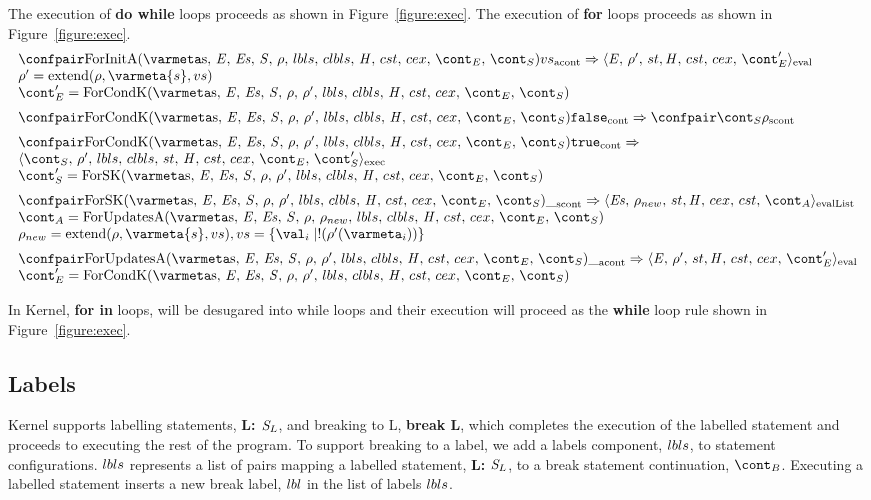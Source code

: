 \documentclass{article}
\DeclareMathOperator{\extend}{extend}
\begin{document}
The execution of \textbf{do while} loops proceeds as shown in Figure~\ref{figure:exec}.
The execution of \textbf{for} loops proceeds as shown in Figure~\ref{figure:exec}.
\[
 \begin{array}{l}
	\acontconf{\ForInitA}{\vals}
	\Rightarrow
	\evalconf{\expressionmeta}{\env'}{\strace}{\cstrace}{\cex}{\econt'} \\
	\env' = \extend(\env, \varmeta{s}, \vals) \\
	\econt' = \ForCondK
	\\[2mm]

	\contconf{\ForCondK}{\tt{false}}
	\Rightarrow
	\scontconf{\scont}{\env}
	\\[2mm]

	\contconf{\ForCondK}{\tt{true}}
	\Rightarrow \\
	\execconf{\scont}{\env'}{\lbls}{\clbls}{\handler}{\cstrace}{\cex}{\econt}{\scont'} \\
	\scont' = \ForSK
	\\[2mm]

	\scontconf{\ForSK}{\_}
	\Rightarrow
	\evallistconf{\exprs}{\env_{new}}{st}{cex}{cst}{\acont} \\
	\acont = \ForUpdatesA{\env_{new}} \\
	\env_{new} = \extend(\env, \varmeta{s}, \vals), \vals = \{\val_i \mid \deref(\env'(\varmeta_i))\}
	\\[2mm]

	\acontconf{\ForUpdatesA{\env'}}{\_}
	\Rightarrow
	\evalconf{\expressionmeta}{\env'}{\strace}{\cstrace}{\cex}{\econt'}\\
	\econt' = \ForCondK
 \end{array}
\]

In Kernel, \textbf{for in} loops, will be desugared into while loops and their execution will proceed as the \textbf{while} loop rule shown in Figure~\ref{figure:exec}.
\subsection{Labels}

Kernel supports labelling statements, \textbf{L: $\mathit{S}_{L}$}, and breaking to L, \textbf{break L}, which completes the execution of the labelled statement and proceeds to executing the rest of the program.
To support breaking to a label, we add a labels component, $lbls$, to statement configurations.
$lbls$ represents a list of pairs mapping a labelled statement, \textbf{L: $\mathit{S}_L$}, to a break statement continuation, $\bcont$.
Executing a labelled statement inserts a new break label, $lbl$ in the list of labels $lbls$.
\end{document}
